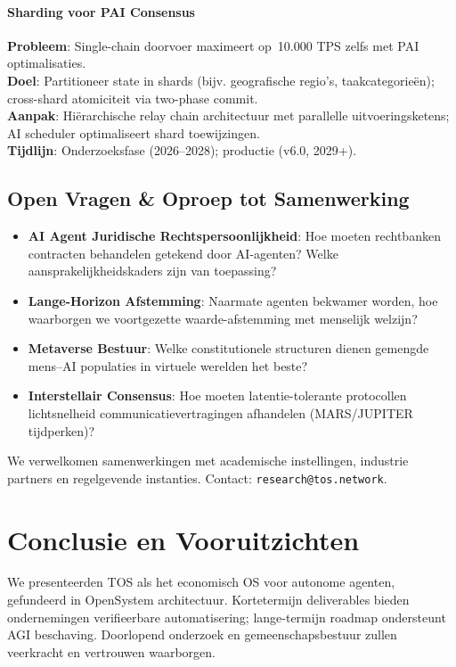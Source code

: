 \documentclass[11pt]{article}
\begin{document}
\paragraph{Sharding voor PAI Consensus}
\textbf{Probleem}: Single-chain doorvoer maximeert op~10.000 TPS zelfs met PAI optimalisaties.\\
\textbf{Doel}: Partitioneer state in shards (bijv. geografische regio's, taakcategorieën); cross-shard atomiciteit via two-phase commit.\\
\textbf{Aanpak}: Hiërarchische relay chain architectuur met parallelle uitvoeringsketens; AI scheduler optimaliseert shard toewijzingen.\\
\textbf{Tijdlijn}: Onderzoeksfase (2026--2028); productie (v6.0, 2029+).

\subsection{Open Vragen \& Oproep tot Samenwerking}

\begin{itemize}[noitemsep]
  \item \textbf{AI Agent Juridische Rechtspersoonlijkheid}: Hoe moeten rechtbanken contracten behandelen getekend door AI-agenten? Welke aansprakelijkheidskaders zijn van toepassing?
  \item \textbf{Lange-Horizon Afstemming}: Naarmate agenten bekwamer worden, hoe waarborgen we voortgezette waarde-afstemming met menselijk welzijn?
  \item \textbf{Metaverse Bestuur}: Welke constitutionele structuren dienen gemengde mens--AI populaties in virtuele werelden het beste?
  \item \textbf{Interstellair Consensus}: Hoe moeten latentie-tolerante protocollen lichtsnelheid communicatievertragingen afhandelen (MARS/JUPITER tijdperken)?
\end{itemize}

We verwelkomen samenwerkingen met academische instellingen, industrie partners en regelgevende instanties. Contact: \texttt{research@tos.network}.

\section{Conclusie en Vooruitzichten}
We presenteerden TOS als het economisch OS voor autonome agenten, gefundeerd in OpenSystem architectuur. Kortetermijn deliverables bieden ondernemingen verifieerbare automatisering; lange-termijn roadmap ondersteunt AGI beschaving. Doorlopend onderzoek en gemeenschapsbestuur zullen veerkracht en vertrouwen waarborgen.
\end{document}
